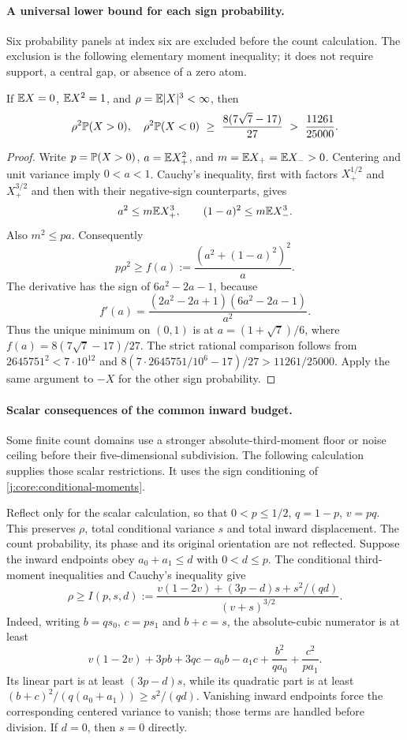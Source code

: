 \paragraph{A universal lower bound for each sign probability.}
\label{j:local:ext:sign-mass}
Six probability panels at index six are excluded before the count
calculation. The exclusion is the following elementary moment inequality;
it does not require support, a central gap, or absence of a zero atom.

\begin{lemma}\label{j:local:sign-mass}
If $\mathbb E X=0$, $\mathbb E X^2=1$, and $\rho=\mathbb E|X|^3<\infty$, then
\[
 \rho^2\mathbb P(X>0),\quad \rho^2\mathbb P(X<0)
 \ \ge\ \frac{8(7\sqrt7-17)}{27}
 \ >\ \frac{11261}{25000}.
\]
\end{lemma}
\begin{proof}
Write $p=\mathbb P(X>0)$, $a=\mathbb E X_+^2$, and
$m=\mathbb E X_+=\mathbb E X_->0$. Centering and unit variance imply
$0<a<1$. Cauchy's inequality, first with factors
$X_+^{1/2}$ and $X_+^{3/2}$ and then with their negative-sign
counterparts, gives
\[
 a^2\le m\mathbb E X_+^3,\qquad (1-a)^2\le m\mathbb E X_-^3.
\]
Also $m^2\le pa$. Consequently
\[
 p\rho^2\ge f(a):=\frac{(a^2+(1-a)^2)^2}{a}.
\]
The derivative has the sign of $6a^2-2a-1$, because
\[
 f'(a)=\frac{(2a^2-2a+1)(6a^2-2a-1)}{a^2}.
\]
Thus the unique minimum on $(0,1)$ is at
$a=(1+\sqrt7)/6$, where
$f(a)=8(7\sqrt7-17)/27$. The strict rational comparison follows
from $2645751^2<7\cdot10^{12}$ and
$8(7\cdot2645751/10^6-17)/27>11261/25000$.
Apply the same argument to $-X$ for the other sign probability.
\end{proof}



\paragraph{Scalar consequences of the common inward budget.}
\label{j:local:ext:inward-scalar}
Some finite count domains use a stronger absolute-third-moment floor or
noise ceiling before their five-dimensional subdivision. The following
calculation supplies those scalar restrictions. It uses the sign
conditioning of \eqref{j:core:conditional-moments}.

Reflect only for the scalar calculation, so that
$0<p\le1/2$, $q=1-p$, $v=pq$. This preserves $\rho$, total
conditional variance $s$ and total inward displacement. The count
probability, its phase and its original orientation are not reflected.
Suppose the inward endpoints obey $a_0+a_1\le d$ with $0<d\le p$.
The conditional third-moment inequalities and Cauchy's inequality give
\begin{equation}\label{j:local:ext:inward-I}
 \rho\ge I(p,s,d):=
 \frac{v(1-2v)+(3p-d)s+s^2/(qd)}{(v+s)^{3/2}}.
\end{equation}
Indeed, writing $b=qs_0$, $c=ps_1$ and $b+c=s$, the absolute-cubic
numerator is at least
\[
 v(1-2v)+3pb+3qc-a_0b-a_1c
                       +\frac{b^2}{qa_0}+\frac{c^2}{pa_1}.
\]
Its linear part is at least $(3p-d)s$, while its quadratic part is
at least $(b+c)^2/(q(a_0+a_1))\ge s^2/(qd)$.
Vanishing inward endpoints force the corresponding centered variance
to vanish; those terms are handled before division. If $d=0$, then
$s=0$ directly.

